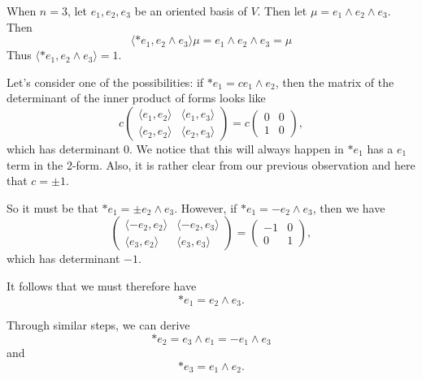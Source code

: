 \documentclass[notoc,notitlepage]{tufte-book}
\begin{document}
\begin{eg}
  When $n = 3$, let $e_1, e_2, e_3$ be an oriented basis of $V$. Then let $\mu =
  e_1 \land e_2 \land e_3$. Then
  \begin{equation*}
    \langle * e_1, e_2 \land e_3 \rangle \mu = e_1 \land e_2 \land e_3 = \mu
  \end{equation*}
  Thus $\langle *e_1, e_2 \land e_3 \rangle = 1$.

  Let's consider one of the possibilities: if $* e_1 = c e_1 \land e_2$, then
  the matrix of the determinant of the inner product of forms looks like
  \begin{equation*}
    c \begin{pmatrix}
      \langle e_1 , e_2 \rangle & \langle e_1, e_3 \rangle \\
      \langle e_2, e_2 \rangle & \langle e_2, e_3 \rangle
    \end{pmatrix}
    = c \begin{pmatrix}
      0 & 0 \\
      1 & 0
    \end{pmatrix},
  \end{equation*}
  which has determinant $0$. We notice that this will always happen in $* e_1$ 
  has a $e_1$ term in the 2-form. Also, it is rather clear from our previous
  observation and here that $c = \pm 1$.

  So it must be that $*e_1 = \pm e_2 \land e_3$. However, if $*e_1 = - e_2 \land
  e_3$, then we have
  \begin{equation*}
    \begin{pmatrix}
      \langle - e_2, e_2 \rangle & \langle - e_2, e_3 \rangle \\
      \langle e_3, e_2 \rangle & \langle e_3, e_3 \rangle
    \end{pmatrix}
    = \begin{pmatrix}
      -1 & 0 \\
      0 & 1
    \end{pmatrix},
  \end{equation*}
  which has determinant $-1$.

  It follows that we must therefore have
  \begin{equation*}
    * e_1 = e_2 \land e_3.
  \end{equation*}

  Through similar steps, we can derive
  \begin{equation*}
    * e_2 = e_3 \land e_1 = - e_1 \land e_3
  \end{equation*}
  and
  \begin{equation*}
    * e_3 = e_1 \land e_2.
  \end{equation*}
\end{eg}
\end{document}
